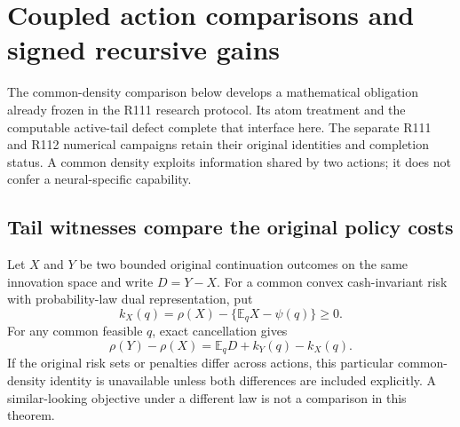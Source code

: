 \section{Coupled action comparisons and signed recursive gains}
\label{sec:coupled119}
The common-density comparison below develops a mathematical obligation
already frozen in the R111 research protocol.  Its atom treatment and the
computable active-tail defect complete that interface here.  The separate
R111 and R112 numerical campaigns retain their original identities and
completion status.  A common density exploits information shared by two
actions; it does not confer a neural-specific capability.

\subsection{Tail witnesses compare the original policy costs}
Let $X$ and $Y$ be two bounded original continuation outcomes on the same
innovation space and write $D=Y-X$.  For a common convex cash-invariant
risk with probability-law dual representation, put
\[
 k_X(q)=\rho(X)-\{\mathbb E_qX-\psi(q)\}\ge0.
\]
For any common feasible $q$, exact cancellation gives
\begin{equation}\label{eq:coupledidentity119}
 \rho(Y)-\rho(X)=\mathbb E_qD+k_Y(q)-k_X(q).
\end{equation}
If the original risk sets or penalties differ across actions, this
particular common-density identity is unavailable unless both differences
are included explicitly.  A similar-looking objective under a different
law is not a comparison in this theorem.

